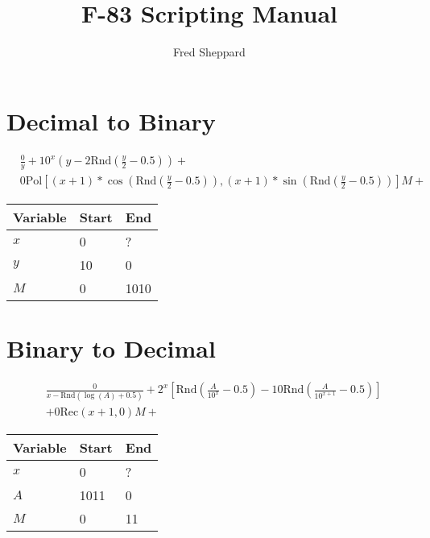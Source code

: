\documentclass[11pt]{article}
\newcommand{\Rnd}{\text{Rnd}}
\newcommand{\Pol}{\text{Pol}}
\newcommand{\Rec}{\text{Rec}}
\begin{document}
    \title{F-83 Scripting Manual}
    \author{Fred Sheppard}
    \maketitle{}
    \pagebreak


    \section{Decimal to Binary}\label{sec:decimal-to-binary}

    \begin{align}
        &\frac{0}{y} + 10^x \left(y-2\Rnd\left(\frac{y}{2}-0.5\right)\right) + \\
        &0\Pol\left[\left(x+1\right) * \cos \left(\Rnd\left(\frac{y}{2}-0.5\right)\right),
        \left(x+1\right) * \sin \left(\Rnd\left(\frac{y}{2}-0.5\right)\right)\right] M+
    \end{align}

    \begin{center}
        \begin{tabular}{|l|l|l|}
            \hline
            Variable & Start & End  \\
            \hline
            $x$      & 0     & ?    \\
            \hline
            $y$      & 10    & 0    \\
            \hline
            $M$      & 0     & 1010 \\
            \hline
        \end{tabular}
    \end{center}


    \section{Binary to Decimal}\label{sec:binary-to-decimal}
    \begin{align}
        &\frac {0} { x - \Rnd\left( \log \left( A \right) + 0.5 \right) } +
        2^x \left[ \Rnd \left( \frac{A} {10^x} - 0.5 \right) -10\Rnd \left( \frac{A}{10^{x+1}}-0.5 \right)\right] \\
        &+ 0\Rec \left( x+1, 0 \right) M+
    \end{align}

    \begin{center}
        \begin{tabular}{|l|l|l|}
            \hline
            Variable & Start & End \\
            \hline
            $x$      & 0     & ?   \\
            \hline
            $A$      & 1011  & 0   \\
            \hline
            $M$      & 0     & 11  \\
            \hline
        \end{tabular}
    \end{center}
\end{document}
